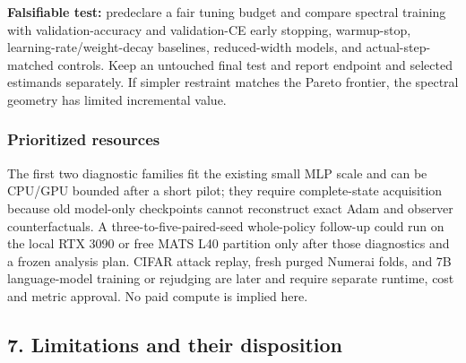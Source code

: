 \documentclass[
  british,
  10pt,
  a4paper,
]{article}
\begin{document}
\textbf{Falsifiable test:} predeclare a fair tuning budget and compare
spectral training with validation-\allowbreak{}accuracy and
validation-\allowbreak{}CE early stopping,
warmup-\allowbreak{}stop,\allowbreak{}
learning-\allowbreak{}rate/\allowbreak{}weight-\allowbreak{}decay
baselines, reduced-\allowbreak{}width models, and
actual-\allowbreak{}step-\allowbreak{} matched controls. Keep an
untouched final test and report endpoint and selected estimands
separately.\allowbreak{} If simpler restraint matches the Pareto
frontier, the spectral geometry has limited incremental value.

\subsubsection{Prioritized
resources}\label{synthesis--prioritized-resources}

The first two diagnostic families fit the existing small MLP scale and
can be CPU/GPU bounded after a short pilot; they require
complete-\allowbreak{}state acquisition because old model-only
checkpoints cannot reconstruct exact Adam and observer
counterfactu\allowbreak{}als.\allowbreak{} A
three-\allowbreak{}to-\allowbreak{}five-\allowbreak{}paired-\allowbreak{}seed
whole-\allowbreak{}policy follow-up could run on the local RTX 3090 or
free MATS L40 partition only after those diagnostics and a frozen
analysis plan. CIFAR attack replay, fresh purged Numerai folds, and 7B
language-\allowbreak{}model training or rejudging are later and require
separate runtime, cost and metric approval. No paid compute is implied
here.

\subsection{7. Limitations and their
disposition}\label{synthesis--limitations-and-their-disposition}
\end{document}
